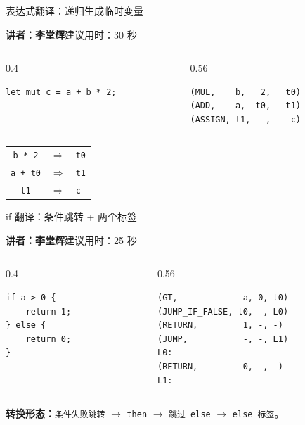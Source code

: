 \documentclass[aspectratio=169]{ctexbeamer}
\newcommand{\speaker}[2]{%
    \vspace{-0.4em}
    \begin{flushright}
        \scriptsize\color{mainblue}\textbf{讲者：#1}\quad 建议用时：#2
    \end{flushright}
    \vspace{-0.7em}
}
\begin{document}
\begin{frame}[fragile]{表达式翻译：递归生成临时变量}
    \speaker{李堂辉}{30 秒}
    \begin{columns}[T]
    \begin{column}{0.4\textwidth}
        \begin{lstlisting}[style=code]
let mut c = a + b * 2;
        \end{lstlisting}
    \end{column}
    \begin{column}{0.56\textwidth}
        \begin{lstlisting}[style=code]
(MUL,    b,   2,   t0)
(ADD,    a,  t0,   t1)
(ASSIGN, t1,  -,    c)
        \end{lstlisting}
    \end{column}
    \end{columns}
    \vspace{0.2em}
    \begin{center}
    \small
    \begin{tabular}{ccl}
        \texttt{b * 2} & $\Rightarrow$ & \texttt{t0} \\
        \texttt{a + t0} & $\Rightarrow$ & \texttt{t1} \\
        \texttt{t1} & $\Rightarrow$ & \texttt{c} \\
    \end{tabular}
    \end{center}
\end{frame}

\begin{frame}[fragile]{if 翻译：条件跳转 + 两个标签}
    \speaker{李堂辉}{25 秒}
    \begin{columns}[T]
    \begin{column}{0.4\textwidth}
        \begin{lstlisting}[style=tinycode]
if a > 0 {
    return 1;
} else {
    return 0;
}
        \end{lstlisting}
    \end{column}
    \begin{column}{0.56\textwidth}
        \begin{lstlisting}[style=tinycode]
(GT,             a, 0, t0)
(JUMP_IF_FALSE, t0, -, L0)
(RETURN,         1, -, -)
(JUMP,           -, -, L1)
L0:
(RETURN,         0, -, -)
L1:
        \end{lstlisting}
    \end{column}
    \end{columns}
    \textbf{转换形态：}\texttt{条件失败跳转} $\rightarrow$ \texttt{then} $\rightarrow$ \texttt{跳过 else} $\rightarrow$ \texttt{else 标签}。
\end{frame}
\end{document}
